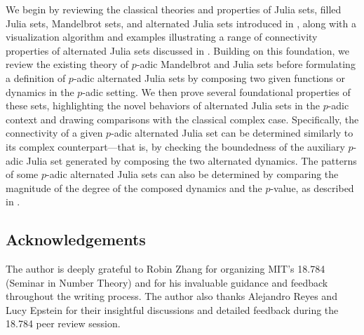 \documentclass{amsart}
\theoremstyle{plain}
\theoremstyle{definition}
\theoremstyle{remark}
\numberwithin{equation}{section}
\begin{document}
We begin by reviewing the classical theories and properties of Julia sets, filled Julia sets, Mandelbrot sets, and alternated Julia sets introduced in \cite[Section 2]{MR2567586}, along with a visualization algorithm and examples illustrating a range of connectivity properties of alternated Julia sets discussed in \cite[Sections 2 and 3]{MR3080737}. Building on this foundation, we review the existing theory of $p$-adic Mandelbrot and Julia sets before formulating a definition of $p$-adic alternated Julia sets by composing two given functions or dynamics in the $p$-adic setting. We then prove several foundational properties of these sets, highlighting the novel behaviors of alternated Julia sets in the $p$-adic context and drawing comparisons with the classical complex case. Specifically, the connectivity of a given $p$-adic alternated Julia set can be determined similarly to its complex counterpart—that is, by checking the boundedness of the auxiliary $p$-adic Julia set generated by composing the two alternated dynamics. The patterns of some $p$-adic alternated Julia sets can also be determined by comparing the magnitude of the degree of the composed dynamics and the $p$-value, as described in \cite[Theorem 1]{MR3113229}.

\subsection{Acknowledgements}
The author is deeply grateful to Robin Zhang for organizing MIT's 18.784 (Seminar in Number Theory) and for his invaluable guidance and feedback throughout the writing process. The author also thanks Alejandro Reyes and Lucy Epstein for their insightful discussions and detailed feedback during the 18.784 peer review session.
\end{document}
